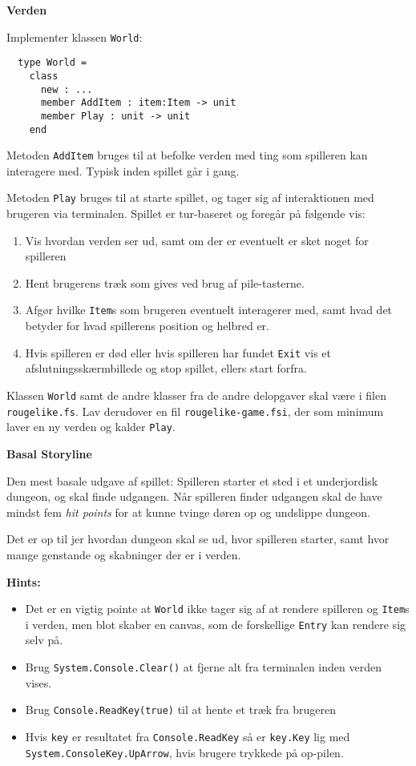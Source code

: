 \textbf{Verden}

Implementer klassen \lstinline{World}:

\begin{lstlisting}
  type World =
    class
      new : ...
      member AddItem : item:Item -> unit
      member Play : unit -> unit
    end
\end{lstlisting}

Metoden \lstinline{AddItem} bruges til at befolke verden med ting som spilleren
kan interagere med. Typisk inden spillet går i gang.

Metoden \lstinline{Play} bruges til at starte spillet, og tager sig af
interaktionen med brugeren via terminalen. Spillet er tur-baseret og
foregår på følgende vis:
\begin{enumerate}
\item Vis hvordan verden ser ud, samt om der er eventuelt er sket
  noget for spilleren
\item Hent brugerens træk som gives ved brug af pile-tasterne.
\item Afgør hvilke \lstinline{Item}s som brugeren eventuelt interagerer med,
  samt hvad det betyder for hvad spillerens position og helbred er.
\item Hvis spilleren er død eller hvis spilleren har fundet
  \lstinline{Exit} vis et afslutningsskærmbillede og stop
  spillet, ellers start forfra.
\end{enumerate}

Klassen \lstinline{World} samt de andre klasser fra de andre
delopgaver skal være i filen \texttt{rougelike.fs}. Lav derudover en
fil \texttt{rougelike-game.fsi}, der som minimum laver en ny verden og
kalder \lstinline{Play}.


\textbf{Basal Storyline}

Den mest basale udgave af spillet: Spilleren starter et sted i et
underjordisk dungeon, og skal finde udgangen. Når spilleren finder
udgangen skal de have mindst fem \emph{hit points} for at kunne tvinge
døren op og undslippe dungeon.

Det er op til jer hvordan dungeon skal se ud, hvor spilleren starter,
samt hvor mange genstande og skabninger der er i verden.


\textbf{Hints:}
\begin{itemize}
\item Det er en vigtig pointe at \lstinline{World} ikke tager sig af
  at rendere spilleren og \lstinline{Item}s i verden, men blot skaber
  en canvas, som de forskellige \lstinline{Entry} kan rendere sig selv
  på.
\item Brug \lstinline{System.Console.Clear()} at fjerne alt fra terminalen inden
  verden vises.
\item Brug \lstinline{Console.ReadKey(true)} til at hente et træk fra brugeren
\item Hvis \lstinline{key} er resultatet fra \lstinline{Console.ReadKey} så er \lstinline{key.Key}
  lig med \lstinline{System.ConsoleKey.UpArrow}, hvis brugere trykkede på
  op-pilen.
\end{itemize}





